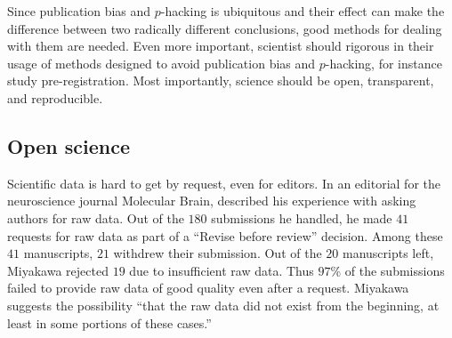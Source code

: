 Since publication bias and $p$-hacking is ubiquitous and their effect can make the difference between two radically different conclusions, good methods for dealing with them are needed. Even more important, scientist should rigorous in their usage of methods designed to avoid publication bias and $p$-hacking, for instance study pre-registration. Most importantly, science should be open, transparent, and reproducible. 

\subsection{Open science}
\label{subsec:open science}
Scientific data is hard to get by request, even for editors. In an editorial for the neuroscience journal Molecular Brain, \textcite{Miyakawa2020-ze} described his experience with asking authors for raw data. Out of the $180$ submissions he handled, he made $41$ requests for raw data as part of a ``Revise before review'' decision. Among these $41$ manuscripts, $21$ withdrew their submission. Out of the $20$ manuscripts left, Miyakawa rejected $19$ due to insufficient raw data. Thus $97\%$ of the submissions failed to provide raw data of good quality even after a request. Miyakawa suggests the possibility ``that the raw data did not exist from the beginning, at least in some portions of these cases.''


